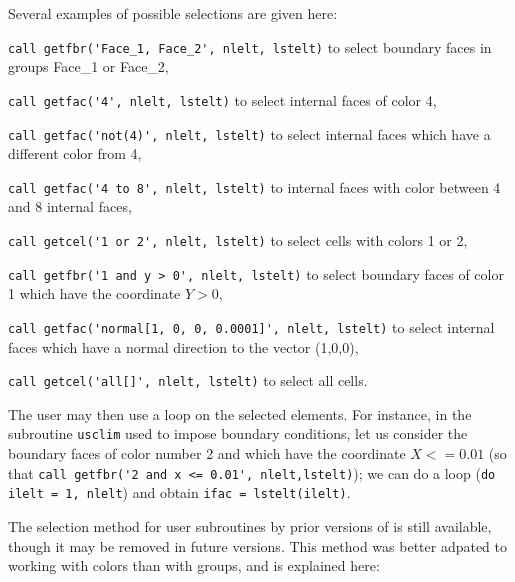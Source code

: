 {{{Several examples of possible selections are given here:
\begin{list}{-}{}
\item \verb+call getfbr('Face_1, Face_2', nlelt, lstelt)+ to select
  boundary faces in groups Face\_1 or Face\_2,  
\item \verb+call getfac('4', nlelt, lstelt)+ to select internal
  faces of color 4,
\item \verb+call getfac('not(4)', nlelt, lstelt)+ to select internal
  faces which have a different color from 4,
\item \verb+call getfac('4 to 8', nlelt, lstelt)+ to internal faces
with color between 4 and 8 internal faces,
\item \verb+call getcel('1 or 2', nlelt, lstelt)+ to select cells
  with colors 1 or 2,
\item \verb+call getfbr('1 and y > 0', nlelt, lstelt)+ to select boundary
  faces of color 1 which have the coordinate $Y > 0$,
\item \verb+call getfac('normal[1, 0, 0, 0.0001]', nlelt, lstelt)+ to select
internal faces which have a normal direction to the vector (1,0,0),  
\item \verb+call getcel('all[]', nlelt, lstelt)+ to select all cells.
\end{list}

The user may then use a loop on the selected elements.
For instance, in the subroutine \texttt{usclim} used to impose
boundary  conditions, let us consider the boundary faces of color
number 2 and which have the coordinate $X <= 0.01$ (so
that \verb+call getfbr('2 and x <= 0.01', nlelt,lstelt)+);
we can do a loop (\verb+do ilelt = 1, nlelt+) and
obtain \verb+ifac = lstelt(ilelt)+.


The selection method for user subroutines by prior versions of \CS
is still available, though it may be removed in future versions.
This method was better adpated to working with colors than with groups,
and is explained here:

}}}

